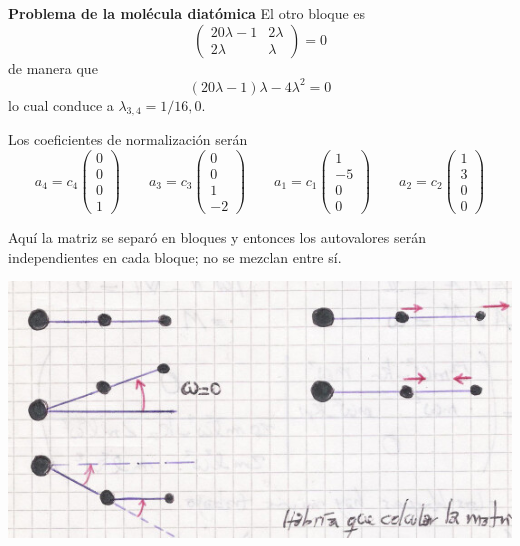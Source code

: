\documentclass[10pt,oneside]{CBFT_book}
\begin{document}
\begin{ejemplo}{\bf Problema de la molécula diatómica}
El otro bloque es
\[
	\begin{pmatrix}
	 20 \lambda - 1 & 2 \lambda  \\
	 2 \lambda & \lambda
	 \end{pmatrix} = 0 
\]
de manera que 
\[
	(20 \lambda - 1) \lambda  - 4\lambda^2 = 0 
\]
lo cual conduce a $\lambda_{3,4} = 1/16, 0 $. 

Los coeficientes de normalización serán
\[
	a_4 = c_4 \begin{pmatrix}
	       0 \\
	       0 \\
	       0 \\
	       1
	      \end{pmatrix} \qquad 
	a_3 = c_3 \begin{pmatrix}
	       0 \\
	       0 \\
	       1 \\
	       -2
	      \end{pmatrix} \qquad 
	a_1 = c_1 \begin{pmatrix}
	       1 \\
	       -5 \\
	       0 \\
	       0
	      \end{pmatrix} \qquad 
	a_2 = c_2 \begin{pmatrix}
	       1 \\
	       3 \\
	       0 \\
	       0
	      \end{pmatrix}
\]

Aquí la matriz se separó en bloques y entonces los autovalores serán independientes en cada
bloque; no se mezclan entre sí.

\includegraphics[scale=0.5]{images/fig_mc_molecula_5.jpg}


\end{ejemplo}
\end{document}
